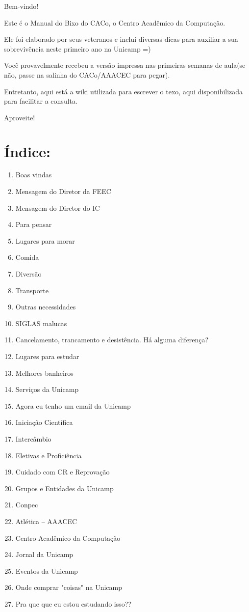 \documentclass[a4paper,10pt]{article}
\begin{document}
Bem-vindo!

Este é o Manual do Bixo do CACo, o Centro Acadêmico da Computação.

Ele foi elaborado por seus veteranos e inclui diversas dicas para auxiliar a sua
sobrevivência neste primeiro ano na Unicamp =)

Você provavelmente recebeu a versão impressa nas primeiras semanas de aula(se
não, passe na salinha do CACo/AAACEC para pegar).

Entretanto, aqui está a wiki utilizada para escrever o texo, aqui
disponibilizada para facilitar a consulta.

Aproveite!

\section{Índice:}
\begin{enumerate}
    \item  Boas vindas
    \item  Mensagem do Diretor da FEEC
    \item  Mensagem do Diretor do IC
    \item  Para pensar
    \item  Lugares para morar
    \item  Comida
    \item  Diversão
    \item  Transporte
    \item  Outras necessidades
    \item  SIGLAS malucas
    \item  Cancelamento, trancamento e desistência. Há alguma diferença?
    \item  Lugares para estudar
    \item  Melhores banheiros
    \item  Serviços da Unicamp
    \item  Agora eu tenho um email da Unicamp
    \item  Iniciação Científica
    \item  Intercâmbio
    \item  Eletivas e Proficiência
    \item  Cuidado com CR e Reprovação
    \item  Grupos e Entidades da Unicamp
    \item  Conpec
    \item  Atlética -- AAACEC
    \item  Centro Acadêmico da Computação
    \item  Jornal da Unicamp
    \item  Eventos da Unicamp
    \item  Onde comprar "coisas" na Unicamp
    \item  Pra que que eu estou estudando isso??
\end{enumerate}
\end{document}
